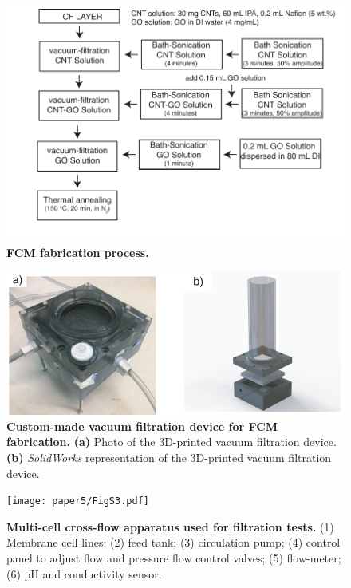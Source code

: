 \begin{figure}[h!]
  \centering
  \includegraphics[width=5in]{paper5/FigS1.pdf}
  \caption{\textbf{FCM fabrication process.}}
  \label{figS1_AppD}
\end{figure}


\begin{figure}
  \centering
  \includegraphics[width=6in]{paper5/FigS2.pdf}
  \caption{\textbf{Custom-made vacuum filtration device for FCM fabrication.} \textbf{(a)} Photo of the 3D-printed vacuum filtration device. \textbf{(b)} \textit{SolidWorks} representation of the 3D-printed vacuum filtration device.}
  \label{figS2_AppD}
\end{figure}

\begin{figure}
  \centering
  \texttt{[image: paper5/FigS3.pdf]}
  \caption{\textbf{Multi-cell cross-flow apparatus used for filtration tests.} (1) Membrane cell lines; (2) feed tank; (3) circulation pump; (4) control panel to adjust flow and pressure flow control valves; (5) flow-meter; (6) pH and conductivity sensor.}
  \label{figS3_AppD}
\end{figure}


